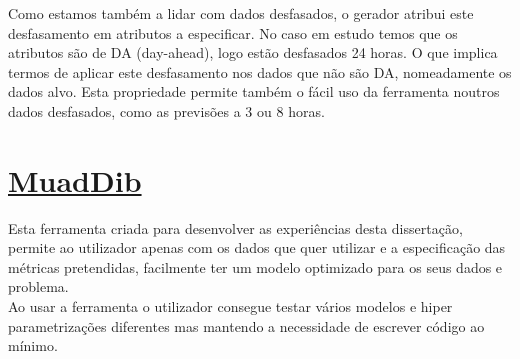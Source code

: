 Como estamos também a lidar com dados desfasados, o gerador atribui este desfasamento em atributos a especificar. No caso em estudo temos que os atributos são de DA (day-ahead), logo estão desfasados 24 horas. O que implica termos de aplicar este desfasamento nos dados que não são DA, nomeadamente os dados alvo. Esta propriedade permite também o fácil uso da ferramenta noutros dados desfasados, como as previsões a 3 ou 8 horas.\\

\section{\href{https://github.com/alquimodelia/MuadDib}{MuadDib}\label{se:muaddib}}

Esta ferramenta criada para desenvolver as experiências desta dissertação, permite ao utilizador apenas com os dados que quer utilizar e a especificação das métricas pretendidas, facilmente ter um modelo optimizado para os seus dados e problema.\\
Ao usar a ferramenta o utilizador consegue testar vários modelos e hiper parametrizações diferentes mas mantendo a necessidade de escrever código ao mínimo.\\
